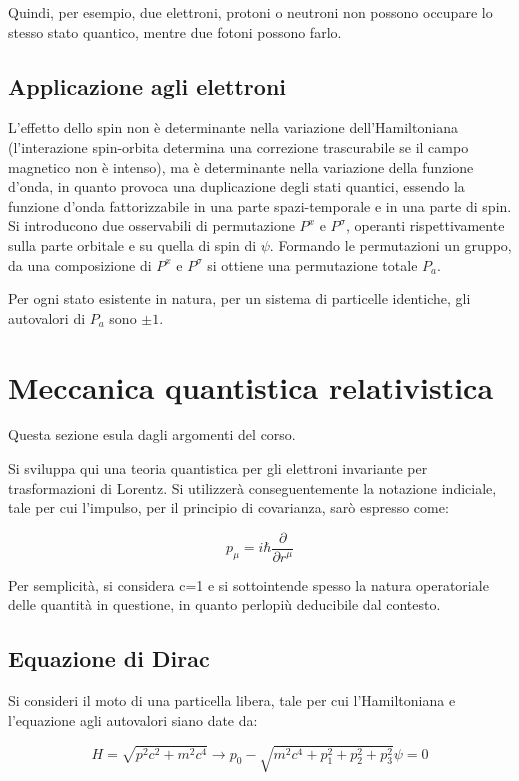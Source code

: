 \documentclass{article}
\begin{document}
Quindi, per esempio, due elettroni, protoni o neutroni non possono occupare lo stesso stato quantico, mentre due fotoni possono farlo.

\subsection*{Applicazione agli elettroni}
L'effetto dello spin non è determinante nella variazione dell'Hamiltoniana (l'interazione spin-orbita determina una correzione trascurabile se il campo
magnetico non è intenso), ma è determinante nella variazione della funzione d'onda, in quanto provoca una duplicazione degli stati quantici,
essendo la funzione d'onda fattorizzabile in una parte spazi-temporale e in una parte di spin.
Si introducono due osservabili di permutazione $P^x$ e $P^\sigma$, operanti rispettivamente sulla parte orbitale e su quella di spin di $\psi$.
Formando le permutazioni un gruppo, da una composizione di $P^x$ e $P^\sigma$ si ottiene una permutazione totale $P_a$.

Per ogni stato esistente in natura, per un sistema di particelle identiche, gli autovalori di $P_a$ sono $\pm 1$.

\section{Meccanica quantistica relativistica}
Questa sezione esula dagli argomenti del corso.

Si sviluppa qui una teoria quantistica per gli elettroni invariante per trasformazioni di Lorentz.
Si utilizzerà conseguentemente la notazione indiciale, tale per cui l'impulso, per il principio di covarianza, sarò espresso come:

\begin{equation}
  p_\mu=i\hbar\frac{\partial}{\partial r^{\mu}}
\end{equation}


Per semplicità, si considera c=1 e si sottointende spesso la natura operatoriale delle quantità in questione, in quanto perlopiù deducibile
dal contesto.

\subsection{Equazione di Dirac}


Si consideri il moto di una particella libera, tale per cui l'Hamiltoniana e l'equazione agli autovalori siano date da:

\begin{equation}
  H=\sqrt{p^2c^2+m^2c^4} \rightarrow p_0-\sqrt{m^2c^4+p_1^2+p_2^2+p_3^2}\psi=0
\end{equation}
\end{document}
